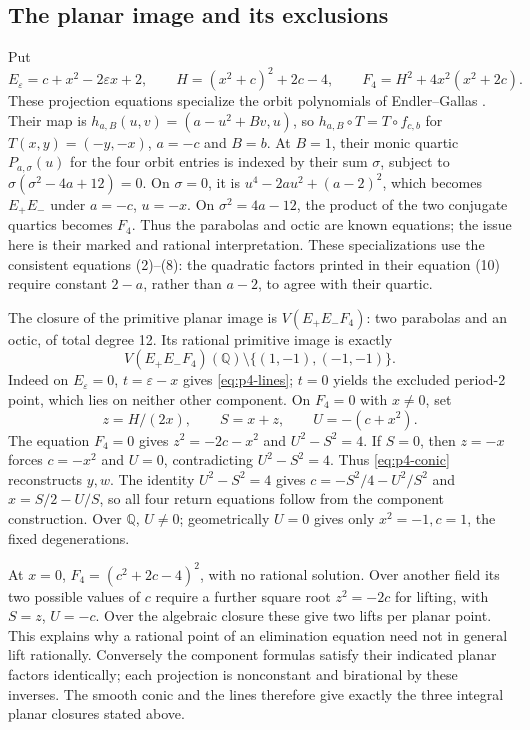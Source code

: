 \documentclass{jT}
\newcommand{\Q}{\mathbb Q}
\begin{document}
\subsection{The planar image and its exclusions}\label{sec:p4-plane}
Put
\[
E_\varepsilon=c+x^2-2\varepsilon x+2,\qquad
H=(x^2+c)^2+2c-4,\qquad F_4=H^2+4x^2(x^2+2c).
\]
These projection equations specialize the orbit polynomials of Endler--Gallas \cite[eqs.~(2)--(8)]{endler-gallas}. Their map is $h_{a,B}(u,v)=(a-u^2+Bv,u)$, so $h_{a,B}\circ T=T\circ f_{c,b}$ for $T(x,y)=(-y,-x)$, $a=-c$ and $B=b$. At $B=1$, their monic quartic $P_{a,\sigma}(u)$ for the four orbit entries is indexed by their sum $\sigma$, subject to $\sigma(\sigma^2-4a+12)=0$. On $\sigma=0$, it is $u^4-2au^2+(a-2)^2$, which becomes $E_+E_-$ under $a=-c$, $u=-x$. On $\sigma^2=4a-12$, the product of the two conjugate quartics becomes $F_4$. Thus the parabolas and octic are known equations; the issue here is their marked and rational interpretation. These specializations use the consistent equations (2)--(8): the quadratic factors printed in their equation (10) require constant $2-a$, rather than $a-2$, to agree with their quartic.

The closure of the primitive planar image is $V(E_+E_-F_4)$: two parabolas and an octic, of total degree 12. Its rational primitive image is exactly
\[
V(E_+E_-F_4)(\Q)\setminus\{(1,-1),(-1,-1)\}.
\]
Indeed on $E_\varepsilon=0$, $t=\varepsilon-x$ gives \eqref{eq:p4-lines}; $t=0$ yields the excluded period-2 point, which lies on neither other component. On $F_4=0$ with $x\ne0$, set
\begin{equation}\label{eq:p4-lift}
z=H/(2x),\qquad S=x+z,\qquad U=-(c+x^2).
\end{equation}
The equation $F_4=0$ gives $z^2=-2c-x^2$ and $U^2-S^2=4$. If $S=0$, then $z=-x$ forces $c=-x^2$ and $U=0$, contradicting $U^2-S^2=4$. Thus \eqref{eq:p4-conic} reconstructs $y,w$. The identity $U^2-S^2=4$ gives $c=-S^2/4-U^2/S^2$ and $x=S/2-U/S$, so all four return equations follow from the component construction. Over $\Q$, $U\ne0$; geometrically $U=0$ gives only $x^2=-1,c=1$, the fixed degenerations.

At $x=0$, $F_4=(c^2+2c-4)^2$, with no rational solution. Over another field its two possible values of $c$ require a further square root $z^2=-2c$ for lifting, with $S=z$, $U=-c$. Over the algebraic closure these give two lifts per planar point. This explains why a rational point of an elimination equation need not in general lift rationally. Conversely the component formulas satisfy their indicated planar factors identically; each projection is nonconstant and birational by these inverses. The smooth conic and the lines therefore give exactly the three integral planar closures stated above.
\end{document}
